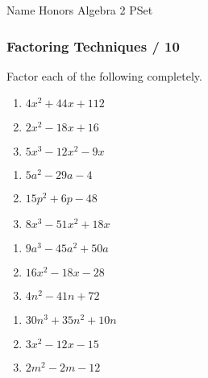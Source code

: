 \documentclass{article}
\newcounter{PS}
\begin{document}
Name \makebox[3in]{\hrulefill} \hfill Honors Algebra 2 PSet

\subsubsection*{Factoring Techniques \hfill \makebox[0.35in]{\hrulefill} / 10}

Factor each of the following completely.
\begin{multicols}{3}
\begin{enumerate}
    \item \quad $4x^2 + 44x + 112$
    \item \quad $2x^2 - 18x + 16$
    \item \quad $5x^3-12x^2-9x$
\setcounter{PS}{\value{enumi}}
\end{enumerate}
\end{multicols}
\vfill

\begin{multicols}{3}
\begin{enumerate}
\setcounter{enumi}{\value{PS}}
    \item \quad $5a^2-29a-4$
    \item \quad $15p^2+6p-48$
    \item \quad $8x^3-51x^2+18x$
\setcounter{PS}{\value{enumi}}
\end{enumerate}
\end{multicols}
\vfill

\begin{multicols}{3}
\begin{enumerate}
\setcounter{enumi}{\value{PS}}
    \item \quad $9a^3-45a^2+50a$
    \item \quad $16x^2-18x-28$
    \item \quad $4n^2-41n+72$
\setcounter{PS}{\value{enumi}}
\end{enumerate}
\end{multicols}
\vfill

\begin{multicols}{3}
\begin{enumerate}
\setcounter{enumi}{\value{PS}}
    \item \quad $30n^3+35n^2+10n$
    \item \quad $3x^2-12x-15$
    \item \quad $2m^2-2m-12$
\setcounter{PS}{\value{enumi}}
\end{enumerate}
\end{multicols}
\vfill
\end{document}
